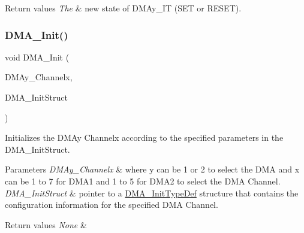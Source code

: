\begin{DoxyRetVals}{Return values}
{\em The} & new state of D\+M\+Ay\+\_\+\+IT (S\+ET or R\+E\+S\+ET). \\
\hline
\end{DoxyRetVals}
\mbox{\label{group___d_m_a___private___functions_ga7c3d1b9dc041f8e5f2cfc8d5dd858278}} 
\subsubsection{\texorpdfstring{DMA\_Init()}{DMA\_Init()}}
{\footnotesize\ttfamily void D\+M\+A\+\_\+\+Init (\begin{DoxyParamCaption}\item[{\mbox{\hyperlink{struct_d_m_a___channel___type_def}{D\+M\+A\+\_\+\+Channel\+\_\+\+Type\+Def}} $\ast$}]{D\+M\+Ay\+\_\+\+Channelx,  }\item[{\mbox{\hyperlink{struct_d_m_a___init_type_def}{D\+M\+A\+\_\+\+Init\+Type\+Def}} $\ast$}]{D\+M\+A\+\_\+\+Init\+Struct }\end{DoxyParamCaption})}



Initializes the D\+M\+Ay Channelx according to the specified parameters in the D\+M\+A\+\_\+\+Init\+Struct. 


\begin{DoxyParams}{Parameters}
{\em D\+M\+Ay\+\_\+\+Channelx} & where y can be 1 or 2 to select the D\+MA and x can be 1 to 7 for D\+M\+A1 and 1 to 5 for D\+M\+A2 to select the D\+MA Channel. \\
\hline
{\em D\+M\+A\+\_\+\+Init\+Struct} & pointer to a \mbox{\hyperlink{struct_d_m_a___init_type_def}{D\+M\+A\+\_\+\+Init\+Type\+Def}} structure that contains the configuration information for the specified D\+MA Channel. \\
\hline
\end{DoxyParams}

\begin{DoxyRetVals}{Return values}
{\em None} & \\
\hline
\end{DoxyRetVals}
\mbox{\label{group___d_m_a___private___functions_ga0bb60360be9cd57f96399be2f3b5eb2b}} 
